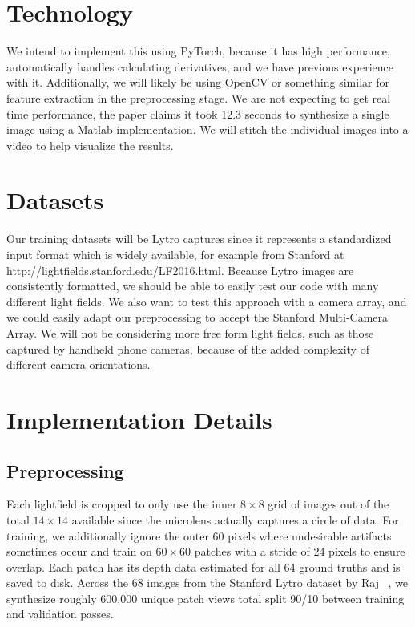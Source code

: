 \documentclass[10pt,twocolumn,letterpaper]{article}
\begin{document}
\section{Technology}

We intend to implement this using PyTorch, because it has high performance, 
automatically handles calculating derivatives, and we have previous experience with it.
Additionally, we will likely be using OpenCV or something similar for feature extraction
in the preprocessing stage.
We are not expecting to get real time performance, the paper claims it took 12.3 seconds to synthesize
a single image using a Matlab implementation. We will stitch the individual images into a video to
help visualize the results.

\section{Datasets}

Our training datasets will be Lytro captures since it represents a standardized input format which is
widely available, for example from Stanford at http://lightfields.stanford.edu/LF2016.html.
Because Lytro images are consistently formatted, we should be able to easily test our code with many different
light fields. We also want to test this approach with a camera array, and we could easily adapt our preprocessing
to accept the Stanford Multi-Camera Array. We will not be considering more free form light fields, such as those
captured by handheld phone cameras, because of the added complexity of different camera orientations.

\section{Implementation Details}


\subsection{Preprocessing}

Each lightfield is cropped to only use the inner $8 \times 8$ grid of images out of the total $14 \times 14$ available
since the microlens actually captures a circle of data. For training, we additionally ignore the outer 60 pixels where
undesirable artifacts sometimes occur and train on $60\times60$ patches with a stride of 24 pixels to ensure overlap.
Each patch has its depth data estimated for all 64 ground truths and is saved to disk. Across the 68 images from the
Stanford Lytro dataset by Raj \etal~\cite{StanfordLytro}, we synthesize roughly 600,000 unique patch views total split
90/10 between training and validation passes.
\end{document}
